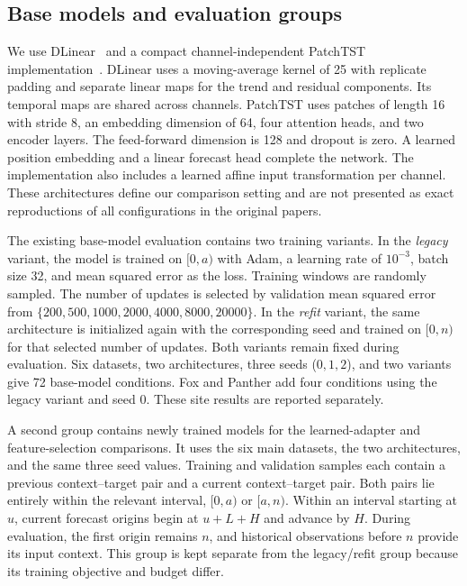 \begin{table}[!t]
\caption{Prepared series used for evaluation. Evaluation start is a zero-based sample index. The Blocks column gives the number of complete target blocks. Fox and Panther are additional sites from the same BDG2 corpus. The common lookback, horizon, and stride are specified in the text.}
\label{tab:datasets}
\centering

\end{table}

\subsection{Base models and evaluation groups}
We use DLinear~\cite{dlinear2022} and a compact channel-independent PatchTST implementation~\cite{patchtst2023}. DLinear uses a moving-average kernel of 25 with replicate padding and separate linear maps for the trend and residual components. Its temporal maps are shared across channels. PatchTST uses patches of length 16 with stride 8, an embedding dimension of 64, four attention heads, and two encoder layers. The feed-forward dimension is 128 and dropout is zero. A learned position embedding and a linear forecast head complete the network. The implementation also includes a learned affine input transformation per channel. These architectures define our comparison setting and are not presented as exact reproductions of all configurations in the original papers.

The existing base-model evaluation contains two training variants. In the \emph{legacy} variant, the model is trained on $[0,a)$ with Adam, a learning rate of $10^{-3}$, batch size 32, and mean squared error as the loss. Training windows are randomly sampled. The number of updates is selected by validation mean squared error from $\{200,500,1000,2000,4000,8000,20000\}$. In the \emph{refit} variant, the same architecture is initialized again with the corresponding seed and trained on $[0,n)$ for that selected number of updates. Both variants remain fixed during evaluation. Six datasets, two architectures, three seeds ($0,1,2$), and two variants give 72 base-model conditions. Fox and Panther add four conditions using the legacy variant and seed 0. These site results are reported separately.

A second group contains newly trained models for the learned-adapter and feature-selection comparisons. It uses the six main datasets, the two architectures, and the same three seed values. Training and validation samples each contain a previous context--target pair and a current context--target pair. Both pairs lie entirely within the relevant interval, $[0,a)$ or $[a,n)$. Within an interval starting at $u$, current forecast origins begin at $u+L+H$ and advance by $H$. During evaluation, the first origin remains $n$, and historical observations before $n$ provide its input context. This group is kept separate from the legacy/refit group because its training objective and budget differ.

